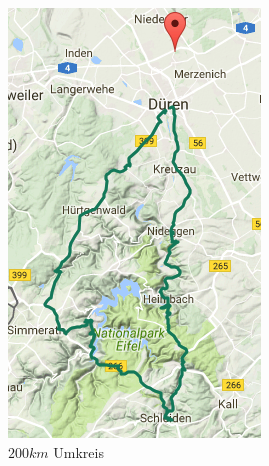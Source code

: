 \documentclass[a4paper,11pt,utf8]{scrartcl}
\begin{document}
\begin{figure}[htb]
\begin{minipage}[t]{0.45\linewidth}
        \includegraphics[width=\linewidth]{pics/nichtabgehackt.PNG}
        \caption{$200km$ Umkreis}\label{fig2}
    \end{minipage}
\end{figure}
\end{document}

